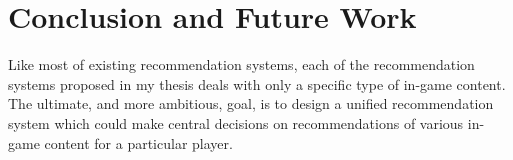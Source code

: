 \chapter{Conclusion and Future Work} %

\label{chapter:conclusion} 

Like most of existing recommendation systems, each of the recommendation systems proposed in my thesis deals with only a specific type of in-game content. The ultimate, and more ambitious, goal, is to design a unified recommendation system which could make central decisions on recommendations of various in-game content for a particular player. 